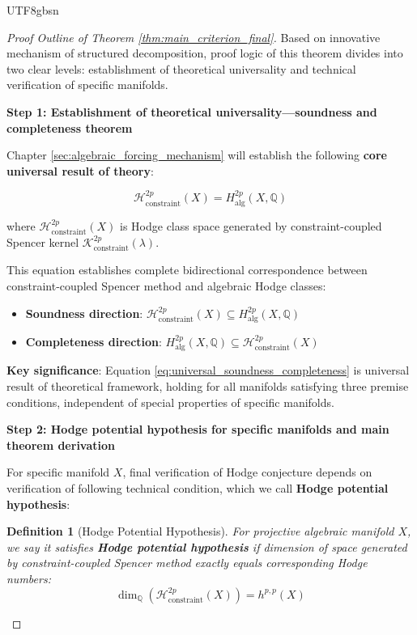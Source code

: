 \documentclass[a4paper,12pt]{extarticle}
\newtheorem{definition}[theorem]{Definition}
\theoremstyle{definition}
\begin{document}
\begin{CJK}{UTF8}{gbsn}
\begin{proof}[Proof Outline of Theorem \ref{thm:main_criterion_final}]
Based on innovative mechanism of structured decomposition, proof logic of this theorem divides into two clear levels: establishment of theoretical universality and technical verification of specific manifolds.

\textbf{Step 1: Establishment of theoretical universality—soundness and completeness theorem}

Chapter \ref{sec:algebraic_forcing_mechanism} will establish the following \textbf{core universal result of theory}:

\begin{equation}
\label{eq:universal_soundness_completeness}
\mathcal{H}_{\text{constraint}}^{2p}(X) = H_{\text{alg}}^{2p}(X, \mathbb{Q})
\end{equation}

where $\mathcal{H}_{\text{constraint}}^{2p}(X)$ is Hodge class space generated by constraint-coupled Spencer kernel $\mathcal{K}^{2p}_{\text{constraint}}(\lambda)$.

This equation establishes complete bidirectional correspondence between constraint-coupled Spencer method and algebraic Hodge classes:
\begin{itemize}
    \item \textbf{Soundness direction}: $\mathcal{H}_{\text{constraint}}^{2p}(X) \subseteq H_{\text{alg}}^{2p}(X, \mathbb{Q})$
    \item \textbf{Completeness direction}: $H_{\text{alg}}^{2p}(X, \mathbb{Q}) \subseteq \mathcal{H}_{\text{constraint}}^{2p}(X)$
\end{itemize}

\textbf{Key significance}: Equation \eqref{eq:universal_soundness_completeness} is universal result of theoretical framework, holding for all manifolds satisfying three premise conditions, independent of special properties of specific manifolds.

\textbf{Step 2: Hodge potential hypothesis for specific manifolds and main theorem derivation}

For specific manifold $X$, final verification of Hodge conjecture depends on verification of following technical condition, which we call \textbf{Hodge potential hypothesis}:

\begin{definition}[Hodge Potential Hypothesis]
\label{def:hodge_potential_hypothesis}
For projective algebraic manifold $X$, we say it satisfies \textbf{Hodge potential hypothesis} if dimension of space generated by constraint-coupled Spencer method exactly equals corresponding Hodge numbers:
\begin{equation}
\label{eq:hodge_potential_hypothesis}
\dim_{\mathbb{Q}}(\mathcal{H}_{\text{constraint}}^{2p}(X)) = h^{p,p}(X)
\end{equation}
\end{definition}


\end{proof}
\end{CJK}
\end{document}
